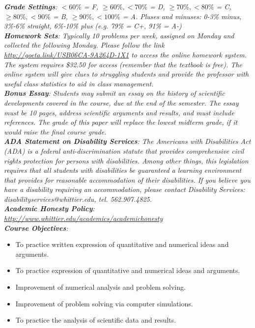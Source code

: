 \documentclass[10pt]{article}
\begin{document}
\textit{\textbf{Grade Settings}: $<60\%$ = F, $\geq 60\%, <70\%$ = D, $\geq 70\%, <80\%$ = C, $\geq 80\%, <90\%$ = B, $\geq 90\%, <100\%$ = A.  Pluses and minuses: 0-3\% minus, 3\%-6\% straight, 6\%-10\% plus (e.g. 79\% = C+, 91\% = A-)} \\
\textit{\textbf{Homework Sets}: Typically 10 problems per week, assigned on Monday and collected the following Monday. Please follow the link \url{http://goeta.link/USB06CA-9A264D-1X1} to access the online homework system. The system requires \$32.50 for access (remember that the textbook is free). The online system will give clues to struggling students and provide the professor with useful class statistics to aid in class management.} \\
\textit{\textbf{Bonus Essay}: Students may submit an essay on the history of scientific developments covered in the course, due at
the end of the semester. The essay must be 10 pages, address scientific arguments and results, and must include
references. The grade of this paper will replace the lowest midterm grade, if it would raise the final course grade.} \\
\textit{\textbf{ADA Statement on Disability Services}: The Americans with Disabilities Act (ADA) is a federal anti-discrimination statute that provides comprehensive civil rights protection for persons with disabilities. Among other things, this legislation requires that all students with disabilities be guaranteed a learning environment that provides for reasonable accommodation of their disabilities. If you believe you have a disability requiring an accommodation, please contact Disability Services: disabilityservices@whittier.edu, tel. 562.907.4825.} \\
\textit{\textbf{Academic Honesty Policy}: \url{http://www.whittier.edu/academics/academichonesty}} \\
\textit{\textbf{Course Objectives}:}
\begin{itemize}
\item To practice written expression of quantitative and numerical ideas and arguments.
\item To practice expression of quantitative and numerical ideas and arguments.
\item Improvement of numerical analysis and problem solving.
\item Improvement of problem solving via computer simulations.
\item To practice the analysis of scientific data and results.
\end{itemize}
\end{document}
